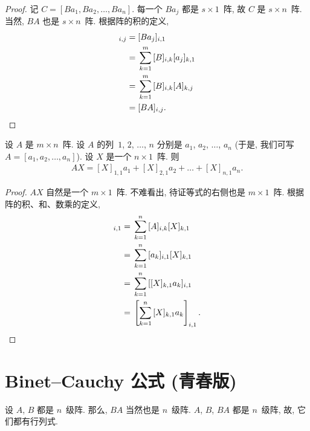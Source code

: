 \begin{proof}
    记 \(C = [Ba_1, Ba_2, \dots, Ba_n]\).
    每一个 \(Ba_j\) 都是 \(s \times 1\)~阵,
    故 \(C\) 是 \(s \times n\)~阵.
    当然, \(BA\) 也是 \(s \times n\)~阵.
    根据阵的积的定义,
    \begin{align*}
        [C]_{i,j}
        = {} & [Ba_j]_{i,1}
        \\
        = {} & \sum_{k = 1}^{m} {[B]_{i,k} [a_j]_{k,1}}
        \\
        = {} & \sum_{k = 1}^{m} {[B]_{i,k} [A]_{k,j}}
        \\
        = {} & [BA]_{i,j}.
        \qedhere
    \end{align*}
\end{proof}

\begin{theorem}
    设 \(A\) 是 \(m \times n\)~阵.
    设 \(A\) 的列~\(1\), \(2\), \(\dots\), \(n\)
    分别是 \(a_1\), \(a_2\), \(\dots\), \(a_n\)
    (于是, 我们可写 \(A = [a_1, a_2, \dots, a_n]\)).
    设 \(X\) 是一个 \(n \times 1\)~阵.
    则
    \begin{align*}
        AX = [X]_{1,1} a_1 + [X]_{2,1} a_2 + \dots
        + [X]_{n,1} a_n.
    \end{align*}
\end{theorem}

\begin{proof}
    \(AX\) 自然是一个 \(m \times 1\)~阵.
    不难看出, 待证等式的右侧也是 \(m \times 1\)~阵.
    根据阵的积、和、数乘的定义,
    \begin{align*}
        [AX]_{i,1}
        = {} & \sum_{k = 1}^{n} {[A]_{i,k} [X]_{k,1}}
        \\
        = {} & \sum_{k = 1}^{n} {[a_k]_{i,1} [X]_{k,1}}
        \\
        = {} & \sum_{k = 1}^{n} {[[X]_{k,1} a_k]_{i,1}}
        \\
        = {} & \left[ \sum_{k = 1}^{n} {[X]_{k,1}
        a_k } \right]_{i,1}.
        \qedhere
    \end{align*}
\end{proof}

\section{Binet--Cauchy 公式 (青春版)}

设 \(A\), \(B\) 都是 \(n\)~级阵.
那么, \(BA\) 当然也是 \(n\)~级阵.
\(A\), \(B\), \(BA\) 都是 \(n\)~级阵,
故, 它们都有行列式.

